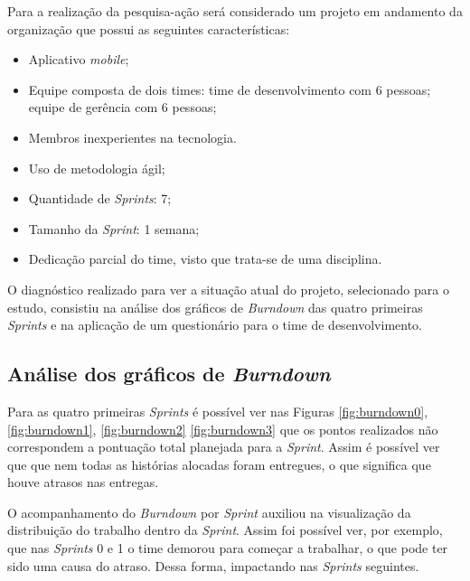 Para a realização da pesquisa-ação será considerado um projeto em andamento da organização que possui as seguintes características:


\begin{itemize}
	\item Aplicativo \textit{mobile};
	\item Equipe composta de dois times:
		 time de desenvolvimento com 6 pessoas;
		 equipe de gerência com 6 pessoas;
	\item Membros inexperientes na tecnologia.
	\item Uso de metodologia ágil;
	\item Quantidade de \textit{Sprints}: 7;
	\item Tamanho da \textit{Sprint}: 1 semana;
	\item Dedicação parcial do time, visto que trata-se de uma disciplina.
\end{itemize}



O diagnóstico realizado para ver a situação atual do projeto, selecionado para o estudo, consistiu na análise 
	dos gráficos de \textit{Burndown} das quatro primeiras \textit{Sprints} e na aplicação de um questionário para o 
	time de desenvolvimento.
	
	\subsection{Análise dos gráficos de \textit{Burndown}}

	Para as quatro primeiras \textit{Sprints} é possível ver nas Figuras \ref{fig:burndown0}, \ref{fig:burndown1}, \ref{fig:burndown2}
	\ref{fig:burndown3} que os pontos realizados não correspondem a pontuação total planejada para a \textit{Sprint}. 
	Assim é possível ver que que nem todas as histórias alocadas foram entregues, o que significa que houve atrasos nas entregas.

	O acompanhamento do \textit{Burndown} por \textit{Sprint} auxiliou na visualização da distribuição do trabalho dentro da \textit{Sprint}.
	Assim foi possível ver, por exemplo, que nas \textit{Sprints} 0 e 1 o time demorou para começar a trabalhar, o que pode ter sido uma causa do atraso. Dessa forma, impactando nas \textit{Sprints} seguintes.

